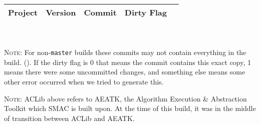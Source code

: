 \documentclass[manual.tex]{subfiles}
\begin{document}
\begin{tabular}{ | l | l | l | l | l | }
\hline
Project & Version & Commit & Dirty Flag \\
\hline
\hline


\end{tabular}
\\
\\
\textsc{Note:} For non-\texttt{master} builds these commits may not contain everything in the build. (). If the dirty flag is 0 that means the commit contains this exact copy, 1 means there were some uncommitted changes, and something else means some other error occurred when we tried to generate this.

\textsc{Note:} ACLib above refers to AEATK, the Algorithm Execution \& Abstraction Toolkit which SMAC is built upon. At the time of this build, it was in the middle of transition between ACLib and AEATK.
\end{document}
